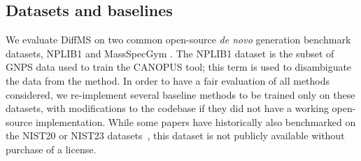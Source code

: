 \documentclass{article}
\theoremstyle{plain}
\theoremstyle{definition}
\theoremstyle{remark}
\newcommand{\ours}{DiffMS\xspace}
\begin{document}

\subsection{Datasets and baselines}

We evaluate \ours on two common open-source \textit{de novo} generation benchmark datasets, NPLIB1 \citep{Dührkop2021} and MassSpecGym \citep{bushuiev2024massspecgymbenchmarkdiscoveryidentification}. The NPLIB1 dataset is the subset of GNPS data used to train the CANOPUS tool; this term is used to disambiguate the data from the method. In order to have a fair evaluation of all methods considered, we re-implement several baseline methods to be trained only on these datasets, with modifications to the codebase if they did not have a working open-source implementation. While some papers have historically also benchmarked on the NIST20 or NIST23 datasets~\citep{nist_database}, this dataset is not publicly available without purchase of a license. %
\end{document}
